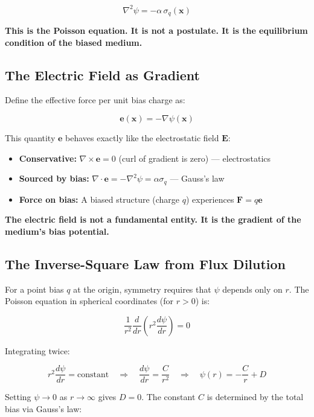 \documentclass[12pt, a4paper]{article}
\begin{document}
\[
\nabla^2 \psi = -\alpha \, \sigma_q(\mathbf{x})
\]

\textbf{This is the Poisson equation. It is not a postulate. It is the equilibrium condition of the biased medium.}

\subsection{The Electric Field as Gradient}
\label{subsec:electric_field_gradient}

Define the effective force per unit bias charge as:

\[
\mathbf{e}(\mathbf{x}) = -\nabla \psi(\mathbf{x})
\]

This quantity \( \mathbf{e} \) behaves exactly like the electrostatic field \( \mathbf{E} \):

\begin{itemize}
    \item \textbf{Conservative:} \( \nabla \times \mathbf{e} = 0 \) (curl of gradient is zero) — electrostatics
    \item \textbf{Sourced by bias:} \( \nabla \cdot \mathbf{e} = -\nabla^2 \psi = \alpha \sigma_q \) — Gauss's law
    \item \textbf{Force on bias:} A biased structure (charge \( q \)) experiences \( \mathbf{F} = q \mathbf{e} \)
\end{itemize}

\textbf{The electric field is not a fundamental entity. It is the gradient of the medium's bias potential.}

\subsection{The Inverse-Square Law from Flux Dilution}
\label{subsec:inverse_square_flux}

For a point bias \( q \) at the origin, symmetry requires that \( \psi \) depends only on \( r \). The Poisson equation in spherical coordinates (for \( r > 0 \)) is:

\[
\frac{1}{r^2} \frac{d}{dr} \left( r^2 \frac{d\psi}{dr} \right) = 0
\]

Integrating twice:

\[
r^2 \frac{d\psi}{dr} = \text{constant} \quad \Rightarrow \quad \frac{d\psi}{dr} = \frac{C}{r^2} \quad \Rightarrow \quad \psi(r) = -\frac{C}{r} + D
\]

Setting \( \psi \to 0 \) as \( r \to \infty \) gives \( D = 0 \). The constant \( C \) is determined by the total bias via Gauss's law:
\end{document}
